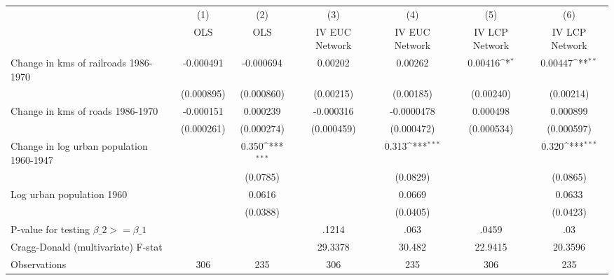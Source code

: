 {
\def\sym#1{\ifmmode^{#1}\else\(^{#1}\)\fi}
\begin{tabular}{l*{6}{c}}
\hline\hline
                &\multicolumn{1}{c}{(1)}&\multicolumn{1}{c}{(2)}&\multicolumn{1}{c}{(3)}&\multicolumn{1}{c}{(4)}&\multicolumn{1}{c}{(5)}&\multicolumn{1}{c}{(6)}\\
                &\multicolumn{1}{c}{OLS}&\multicolumn{1}{c}{OLS}&\multicolumn{1}{c}{IV EUC Network}&\multicolumn{1}{c}{IV EUC Network}&\multicolumn{1}{c}{IV LCP Network}&\multicolumn{1}{c}{IV LCP Network}\\
\hline
Change in kms of railroads 1986-1970&-0.000491         &-0.000694         &  0.00202         &  0.00262         &  0.00416\sym{*}  &  0.00447\sym{**} \\
                &(0.000895)         &(0.000860)         &(0.00215)         &(0.00185)         &(0.00240)         &(0.00214)         \\
[1em]
Change in kms of roads 1986-1970&-0.000151         & 0.000239         &-0.000316         &-0.0000478         & 0.000498         & 0.000899         \\
                &(0.000261)         &(0.000274)         &(0.000459)         &(0.000472)         &(0.000534)         &(0.000597)         \\
[1em]
Change in log urban population 1960-1947&                  &    0.350\sym{***}&                  &    0.313\sym{***}&                  &    0.320\sym{***}\\
                &                  & (0.0785)         &                  & (0.0829)         &                  & (0.0865)         \\
[1em]
Log urban population 1960&                  &   0.0616         &                  &   0.0669         &                  &   0.0633         \\
                &                  & (0.0388)         &                  & (0.0405)         &                  & (0.0423)         \\
\hline
P-value for testing $\beta\_{2} >= \beta\_{1}$&                  &                  &    .1214         &     .063         &    .0459         &      .03         \\
Cragg-Donald (multivariate) F-stat&                  &                  &  29.3378         &   30.482         &  22.9415         &  20.3596         \\
Observations    &      306         &      235         &      306         &      235         &      306         &      235         \\
\hline\hline
\end{tabular}
}

